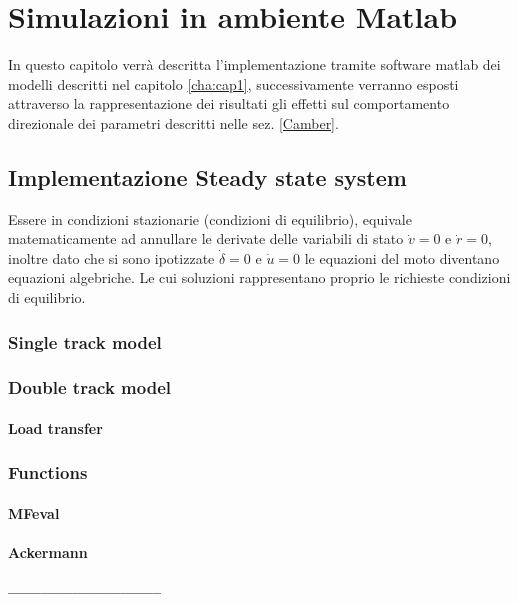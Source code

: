 \chapter{Simulazioni in ambiente Matlab}
\label{cha:cap3}
In questo capitolo verrà descritta l'implementazione tramite software matlab dei modelli descritti nel capitolo \ref{cha:cap1}, successivamente verranno esposti attraverso la rappresentazione dei risultati gli effetti sul comportamento direzionale dei parametri descritti nelle sez. \ref{Camber}.
\section{Implementazione Steady state system}
Essere in condizioni stazionarie (condizioni di equilibrio), equivale matematicamente ad annullare le derivate delle
variabili di stato $\Dot{v}=0$ e $\Dot{r}=0$, inoltre dato che si sono ipotizzate $\Dot{\delta}=0$ e $\Dot{u}=0$ le
equazioni del moto diventano equazioni algebriche.
Le cui soluzioni rappresentano proprio le richieste condizioni di equilibrio.\\

\subsection{Single track model}

\subsection{Double track model}
\subsubsection{Load transfer}

\subsection{Functions}

\subsubsection{MFeval}
\subsubsection{Ackermann}
\subsubsection{-----------------------------}

